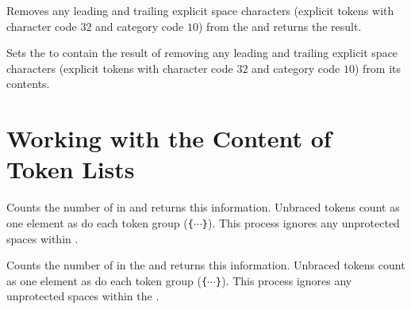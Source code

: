\documentclass[oneside]{book}
\let\tn=\cs
\begin{document}
\begin{function}{\TlTrimSpaces}
\begin{syntax}
 
\end{syntax}
Removes any leading and trailing explicit space characters
(explicit tokens with character code $32$ and category code $10$)
from the  and returns the result.
\end{function}

\begin{function}{\TlVarTrimSpaces}
\begin{syntax}
 
\end{syntax}
Sets the  to contain the result of removing any leading
and trailing explicit space characters (explicit tokens with
character code $32$ and category code $10$) from its contents.
\end{function}

\section{Working with the Content of Token Lists}

\begin{function}{\TlCount}
\begin{syntax}
 
\end{syntax}
Counts the number of  in  and returns this information.
Unbraced tokens count as one element as do each token group (\verb|{|$\cdots$\verb|}|).
This process ignores any unprotected spaces within . %
\end{function}

\begin{function}{\TlVarCount}
\begin{syntax}
 
\end{syntax}
Counts the number of  in the  and returns this information.
Unbraced tokens count as one element as do each token group (\verb|{|$\cdots$\verb|}|).
This process ignores any unprotected spaces within the . %
\end{function}
\end{document}
